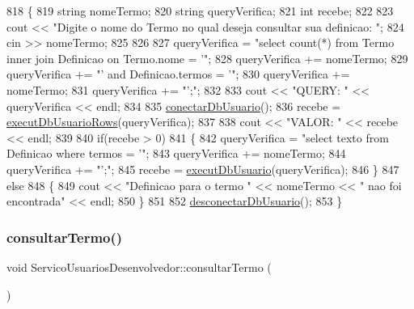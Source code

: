 \begin{DoxyCode}
818 \{
819   \textcolor{keywordtype}{string} nomeTermo;
820   \textcolor{keywordtype}{string} queryVerifica;
821   \textcolor{keywordtype}{int} recebe;
822 
823   cout << \textcolor{stringliteral}{"Digite o nome do Termo no qual deseja consultar sua definicao: "};
824   cin >> nomeTermo;
825 
826 
827   queryVerifica = \textcolor{stringliteral}{"select count(*) from Termo inner join Definicao on Termo.nome = '"};
828   queryVerifica += nomeTermo;
829   queryVerifica += \textcolor{stringliteral}{"' and Definicao.termos = '"};
830   queryVerifica += nomeTermo;
831   queryVerifica += \textcolor{stringliteral}{"';"};
832 
833   cout << \textcolor{stringliteral}{"QUERY: "} <<  queryVerifica << endl;
834 
835   \mbox{\hyperlink{comando_sql_8cpp_a4f89ddcbc4cf8f2587d89f72f8c7900d}{conectarDbUsuario}}();
836   recebe = \mbox{\hyperlink{comando_sql_8cpp_af54952694f2fa7d76f969fb74b853cb9}{executDbUsuarioRows}}(queryVerifica);
837 
838   cout << \textcolor{stringliteral}{"VALOR: "} << recebe << endl;
839 
840   \textcolor{keywordflow}{if}(recebe > 0)
841   \{
842     queryVerifica = \textcolor{stringliteral}{"select texto from Definicao where termos = '"};
843     queryVerifica += nomeTermo;
844     queryVerifica += \textcolor{stringliteral}{"';"};
845     recebe = \mbox{\hyperlink{comando_sql_8cpp_a748197580e7f9acdbf48c78de1f7924b}{executDbUsuario}}(queryVerifica);
846   \}
847   \textcolor{keywordflow}{else}
848   \{
849     cout << \textcolor{stringliteral}{"Definicao para o termo "} << nomeTermo << \textcolor{stringliteral}{" nao foi encontrada"} << endl;
850   \}
851 
852   \mbox{\hyperlink{comando_sql_8cpp_a969be9911913568e30d4ae8963338bc3}{desconectarDbUsuario}}();
853 \}
\end{DoxyCode}
\mbox{\label{class_servico_usuarios_desenvolvedor_a9c4a519147798c77d3fb6406f8078b9f}} 
\subsubsection{\texorpdfstring{consultar\+Termo()}{consultarTermo()}}
{\footnotesize\ttfamily void Servico\+Usuarios\+Desenvolvedor\+::consultar\+Termo (\begin{DoxyParamCaption}{ }\end{DoxyParamCaption})\hspace{0.3cm}{\ttfamily [virtual]}}


